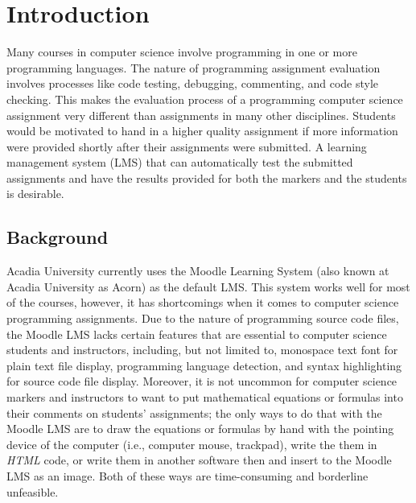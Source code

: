 

\chapter{Introduction}
\label{chap:INTRO}

Many courses in computer science involve programming in one or more programming
languages.
The nature of programming assignment evaluation
involves processes like code testing, debugging, commenting, and code style
checking.
This makes the evaluation process of a programming computer science assignment
very different than assignments in many other disciplines.
Students would be motivated to hand in a higher quality assignment
if more information were provided shortly after their assignments were
submitted.
A learning management system (LMS) that can automatically test the
submitted assignments and have the results provided for both the markers and
the students is desirable.

\section{Background}

Acadia University currently uses the Moodle Learning System (also known at 
Acadia University as Acorn) as the default LMS.
This system works well for most of the courses, however, it has shortcomings
when it comes to computer science programming assignments.
Due to the nature of programming source code files,
the Moodle LMS lacks certain features that are essential to computer science
students and instructors,
including, but not limited to, monospace text font for plain text
file display, programming language detection, and syntax
highlighting for source code file display.
Moreover, it is not uncommon for computer science markers and instructors
to want to put mathematical equations or formulas into their comments on
students' assignments; the only ways to do that with the Moodle
LMS are to draw the equations or formulas by hand with the
pointing device of the computer (i.e., computer mouse, trackpad), write
the them in \emph{HTML} code,
or write them in another software then and insert to the Moodle LMS as an image.
Both of these ways are
time-consuming and borderline unfeasible.

\medskip

